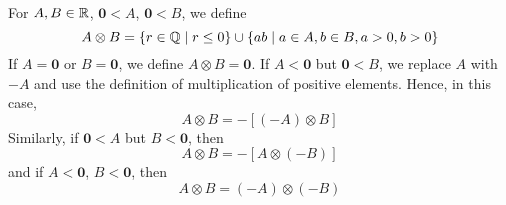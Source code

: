 \documentclass[../main.tex]{subfiles}
\begin{document}
\begin{definition}\label{dfn:7.39}
    For $A,B\in\mathbb{R}$, $\bm{0}<A$, $\bm{0}<B$, we define
    \begin{equation*}
        A\otimes B = \{r\in\mathbb{Q}\mid r\leq 0\}\cup\{ab\mid a\in A,b\in B,a>0,b>0\}
    \end{equation*}
    If $A=\bm{0}$ or $B=\bm{0}$, we define $A\otimes B=\bm{0}$. If $A<\bm{0}$ but $\bm{0}<B$, we replace $A$ with $-A$ and use the definition of multiplication of positive elements. Hence, in this case,
    \begin{equation*}
        A\otimes B = -[(-A)\otimes B]
    \end{equation*}
    Similarly, if $\bm{0}<A$ but $B<\bm{0}$, then
    \begin{equation*}
        A\otimes B = -[A\otimes(-B)]
    \end{equation*}
    and if $A<\bm{0}$, $B<\bm{0}$, then
    \begin{equation*}
        A\otimes B = (-A)\otimes(-B)
    \end{equation*}
\end{definition}
\end{document}
